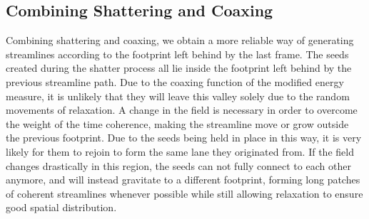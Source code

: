 \subsection{Combining Shattering and Coaxing}
Combining shattering and coaxing, we obtain a more reliable way of generating streamlines according to the footprint left behind by the last frame.
The seeds created during the shatter process all lie inside the footprint left behind by the previous streamline path.
Due to the coaxing function of the modified energy measure, it is unlikely that they will leave this valley solely due to the random movements of relaxation.
A change in the field is necessary in order to overcome the weight of the time coherence, making the streamline move or grow outside the previous footprint.
Due to the seeds being held in place in this way, it is very likely for them to rejoin to form the same lane they originated from.
If the field changes drastically in this region, the seeds can not fully connect to each other anymore, and will instead gravitate to a different footprint,
forming long patches of coherent streamlines whenever possible while still allowing relaxation to ensure good spatial distribution.\\


